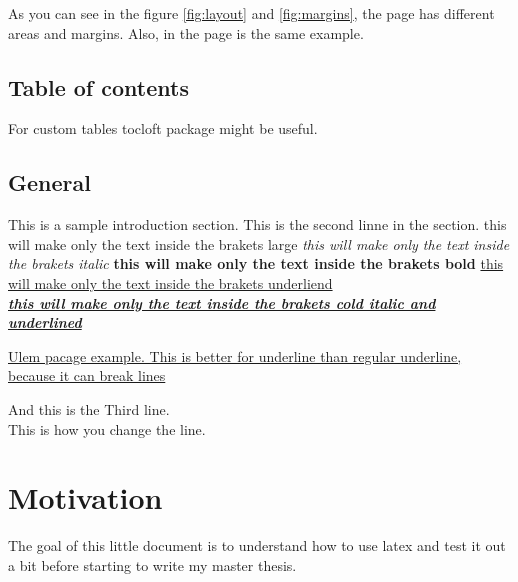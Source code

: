 \documentclass[16pt,a4paper]{article}
\begin{document}
As you can see in the figure \ref{fig:layout} and \ref{fig:margins}, the
page has different areas and margins. Also, in the page \pageref{fig:margins}
is the same example.


\subsection{Table of contents}
For custom tables tocloft package might be useful.
\subsection{General} \label{sec:Mysec}
This is a sample introduction section.
This is the second linne in the section.
{\Large this will make only the text inside the brakets large}
\textit{ this will make only the text inside the brakets italic}
\textbf{ this will make only the text inside the brakets bold}
\underline{this will make only the text inside the brakets underliend} \\
\textbf{\textit{\underline{ this will make only the text inside the brakets cold italic and underlined }}}

\uline{Ulem pacage example. This is better for underline than regular underline, because it can break lines}





And this is the Third line. \\
This is how you change the line.

\section{Motivation}
The goal of this little document is to understand how to use latex and test it out a bit before starting to write my master thesis.

\pagebreak
\end{document}
